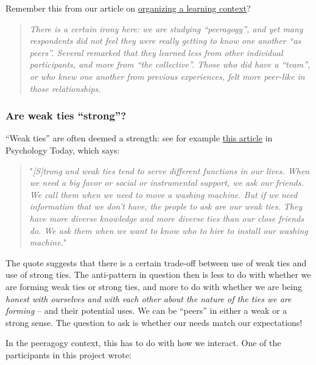 Remember this from our article on
\href{http://peeragogy.org/organizing-a-learning-context/}{organizing a
learning context}?

\begin{quote}
\emph{There is a certain irony here: we are studying ``peeragogy'', and
yet many respondents did not feel they were really getting to know one
another ``as peers''. Several remarked that they learned less from other
individual participants, and more from ``the collective''. Those who did
have a ``team'', or who knew one another from previous experiences, felt
more peer-like in those relationships.}
\end{quote}
\subsubsection{Are weak ties ``strong''?}

``Weak ties'' are often deemed a strength: see for example
\href{http://www.psychologytoday.com/blog/thinking-about-kids/201005/facebook-and-the-strength-weak-ties}{this
article} in Psychology Today, which says:

\begin{quote}
"\emph{{[}S{]}trong and weak ties tend to serve different functions in
our lives. When we need a big favor or social or instrumental support,
we ask our friends. We call them when we need to move a washing machine.
But if we need information that we don't have, the people to ask are our
weak ties. They have more diverse knowledge and more diverse ties than
our close friends do. We ask them when we want to know who to hire to
install our washing machine.}"
\end{quote}
The quote suggests that there is a certain trade-off between use of weak
ties and use of strong ties. The anti-pattern in question then is less
to do with whether we are forming weak ties or strong ties, and more to
do with whether we are being \emph{honest with ourselves and with each
other about the nature of the ties we are forming} -- and their
potential uses. We can be ``peers'' in either a weak or a strong sense.
The question to ask is whether our needs match our expectations!

In the peeragogy context, this has to do with how we interact. One of
the participants in this project wrote:

